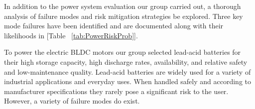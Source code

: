 In addition to the power system evaluation our group carried out, a thorough analysis of failure modes and risk mitigation strategies be explored. Three key mode failures have been identified and are documented along with their likelihoods in [Table ~\ref{tab:PowerRiskProb}].

\begin{table}[H]
\caption{\label{tab:PowerRiskProb} Power System Failure Modes \& Probabilities}
\centering

\end{table}

To power the electric BLDC motors our group selected lead-acid batteries for their high storage capacity, high discharge rates, availability, and relative safety and low-maintenance quality. Lead-acid batteries are widely used for a variety of industrial applications and everyday uses. When handled safely and according to manufacturer specifications they rarely pose a significant risk to the user. However, a variety of failure modes do exist. 

